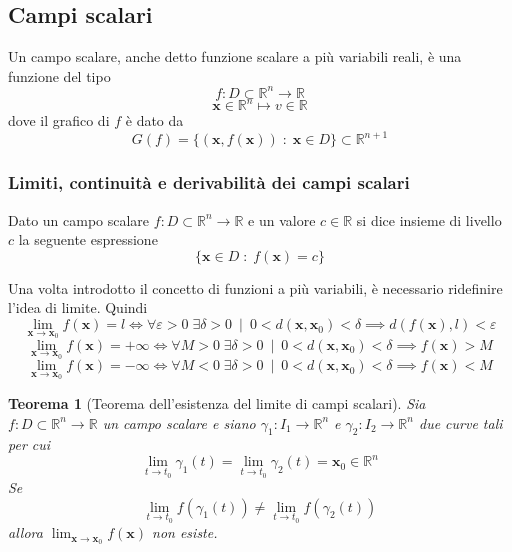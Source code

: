 \documentclass{article}
\newtheorem{theorem}{Teorema}
\begin{document}
        \newpage
        \subsection{Campi scalari}
            Un campo scalare, anche detto funzione scalare a più variabili reali, è una funzione del tipo
            \[
                f: D \subset \mathbb{R}^{n} \rightarrow \mathbb{R}
            \]
            \[
                \mathbf{x} \in \mathbb{R}^{n} \mapsto v \in \mathbb{R}
            \]
            dove il grafico di $f$ è dato da
            \[
                G(f) = \{ (\mathbf{x}, f(\mathbf{x})) \; : \; \mathbf{x} \in D\} \subset \mathbb{R}^{n+1}
            \]

            \vspace{10pt}
            \subsubsection{Limiti, continuità e derivabilità dei campi scalari}
            Dato un campo scalare $f: D \subset \mathbb{R}^{n} \rightarrow \mathbb{R}$ e un valore $c \in \mathbb{R}$ si dice insieme di livello $c$ la seguente espressione
            \[
                \{ \mathbf{x} \in D \; : \; f(\mathbf{x}) = c\}
            \]

            \vspace{10pt}
            Una volta introdotto il concetto di funzioni a più variabili, è necessario ridefinire l'idea di limite. Quindi
            \[
                \lim_{\mathbf{x} \rightarrow \mathbf{x}_0} f(\mathbf{x}) = l \iff \forall \varepsilon > 0 \; \exists \delta > 0 \;\: | \;\: 0 < d(\mathbf{x}, \mathbf{x}_0) < \delta \implies d(f(\mathbf{x}), l) < \varepsilon
            \]
            \[
                \lim_{\mathbf{x} \rightarrow \mathbf{x}_0} f(\mathbf{x}) = +\infty \iff \forall M > 0 \; \exists \delta > 0 \;\: | \;\: 0 < d(\mathbf{x}, \mathbf{x}_0) < \delta \implies f(\mathbf{x}) > M
            \] 
            \[
                \lim_{\mathbf{x} \rightarrow \mathbf{x}_0} f(\mathbf{x}) = -\infty \iff \forall M < 0 \; \exists \delta > 0 \;\: | \;\: 0 < d(\mathbf{x}, \mathbf{x}_0) < \delta \implies f(\mathbf{x}) < M
            \] 

            \begin{theorem} [Teorema dell'esistenza del limite di campi scalari]
                Sia $f: D \subset \mathbb{R}^{n} \rightarrow \mathbb{R}$ un campo scalare e siano $\gamma_1: I_{1} \rightarrow \mathbb{R}^{n}$ e $\gamma_{2}: I_{2} \rightarrow \mathbb{R}^{n}$ due curve tali per cui
                \[
                    \lim_{t \rightarrow t_0} \gamma_{1}(t) = \lim_{t \rightarrow t_0} \gamma_{2}(t) = \mathbf{x}_0 \in \mathbb{R}^{n}
                \]
                Se 
                \[
                    \lim_{t \rightarrow t_0} f(\gamma_{1}(t)) \neq \lim_{t \rightarrow t_0} f(\gamma_{2}(t))
                \]
                allora $\displaystyle \lim_{\mathbf{x} \rightarrow \mathbf{x}_0} f(\mathbf{x})$ non esiste.
            \end{theorem}
\end{document}

